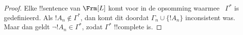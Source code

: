 \documentclass[../../../include/open-logic-section]{subfiles}
\begin{document}
\begin{proof}
Elke !!{sentence} van $\Frm[L]$ komt voor in de opsomming waarmee
~$\Gamma^*$ is gedefinieerd. Als $!A_n \notin \Gamma^*$, dan komt dit
doordat $\Gamma_n \cup \{!A_n\}$ inconsistent was. Maar dan geldt
$\lnot !A_n \in \Gamma^*$, zodat $\Gamma^*$ !!{complete} is.
\end{proof}
\end{document}
